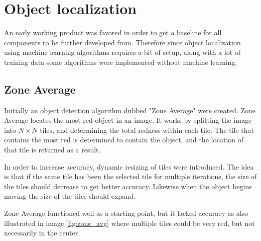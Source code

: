 \section{Object localization}\label{Design:ObjectLocalization}
An early working product was favored in order to get a baseline for all components to be further developed from.
Therefore since object localization using machine learning algorithms requires a bit of setup, along with a lot of training data some algorithms were implemented without machine learning.

\subsection{Zone Average}
Initially an object detection algorithm dubbed "Zone Average" were created.
Zone Average locates the most red object in an image.
It works by splitting the image into $N\times N$ tiles, and determining the total redness within each tile.
The tile that contains the most red is determined to contain the object, and the location of that tile is returned as a result.

In order to increase accuracy, dynamic resizing of tiles were introduced.
The idea is that if the same tile has been the selected tile for multiple iterations, the size of the tiles should decrease to get better accuracy.
Likewise when the object begins moving the size of the tiles should expand.


Zone Average functioned well as a starting point, but it lacked accuracy as also illustrated in image \ref{fig:zone_avg} where multiple tiles could be very red, but not necessarily in the center.

